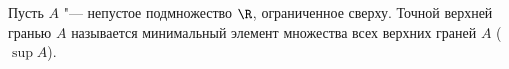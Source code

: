 \label{Dsup}
    Пусть $A$ "--- непустое подмножество $\R$, ограниченное сверху. Точной верхней гранью $A$ называется минимальный
     элемент множества всех верхних граней $A$ ($\sup A$).
 